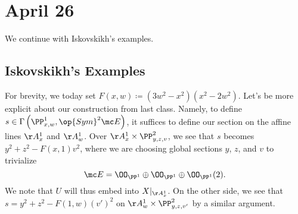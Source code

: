 \documentclass[../notes.tex]{subfiles}
\begin{document}
\section{April 26}

We continue with Iskovskikh's examples.

\subsection{Iskovskikh's Examples}
For brevity, we today set $F(x,w)\coloneqq\left(3w^2-x^2\right)\left(x^2-2w^2\right)$. Let's be more explicit about our construction from last class. Namely, to define $s\in\Gamma\left(\PP^1_{x,w},\op{Sym}^2\mc E\right)$, it suffices to define our section on the affine lines $\AA^1_x$ and $\AA^1_w$. Over $\AA^1_x\times\PP^2_{y,z,v}$, we see that $s$ becomes $y^2+z^2-F(x,1)v^2$, where we are choosing global sections $y$, $z$, and $v$ to trivialize
\[\mc E=\OO_{\PP^1}\oplus\OO_{\PP^1}\oplus\OO_{\PP^1}(2).\]
We note that $U$ will thus embed into $X|_{\AA^1_x}$. On the other side, we see that $s=y^2+z^2-F(1,w)(v')^2$ on $\AA^1_w\times\PP^2_{y,z,v'}$ by a similar argument.
\end{document}
